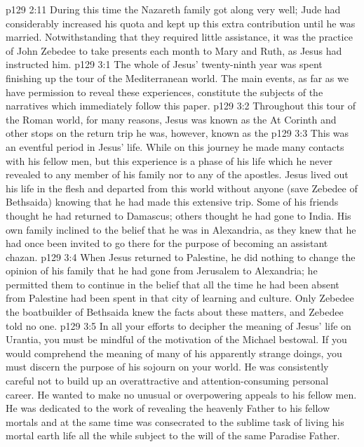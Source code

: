 \pc \vs p129 2:11 During this time the Nazareth family got along very well; Jude had considerably increased his quota and kept up this extra contribution until he was married. Notwithstanding that they required little assistance, it was the practice of John Zebedee to take presents each month to Mary and Ruth, as Jesus had instructed him.
\vs p129 3:1 The whole of Jesus’ twenty\hyp{}ninth year was spent finishing up the tour of the Mediterranean world. The main events, as far as we have permission to reveal these experiences, constitute the subjects of the narratives which immediately follow this paper.\plusone
\pc \vs p129 3:2 Throughout this tour of the Roman world, for many reasons, Jesus was known as the  At Corinth and other stops on the return trip he was, however, known as the 
\vs p129 3:3 This was an eventful period in Jesus’ life. While on this journey he made many contacts with his fellow men, but this experience is a phase of his life which he never revealed to any member of his family nor to any of the apostles. Jesus lived out his life in the flesh and departed from this world without anyone (save Zebedee of Bethsaida) knowing that he had made this extensive trip. Some of his friends thought he had returned to Damascus; others thought he had gone to India. His own family inclined to the belief that he was in Alexandria, as they knew that he had once been invited to go there for the purpose of becoming an assistant chazan.
\vs p129 3:4 When Jesus returned to Palestine, he did nothing to change the opinion of his family that he had gone from Jerusalem to Alexandria; he permitted them to continue in the belief that all the time he had been absent from Palestine had been spent in that city of learning and culture. Only Zebedee the boatbuilder of Bethsaida knew the facts about these matters, and Zebedee told no one.
\pc \vs p129 3:5 In all your efforts to decipher the meaning of Jesus’ life on Urantia, you must be mindful of the motivation of the Michael bestowal. If you would comprehend the meaning of many of his apparently strange doings, you must discern the purpose of his sojourn on your world. He was consistently careful not to build up an overattractive and attention\hyp{}consuming personal career. He wanted to make no unusual or overpowering appeals to his fellow men. He was dedicated to the work of revealing the heavenly Father to his fellow mortals and at the same time was consecrated to the sublime task of living his mortal earth life all the while subject to the will of the same Paradise Father.
